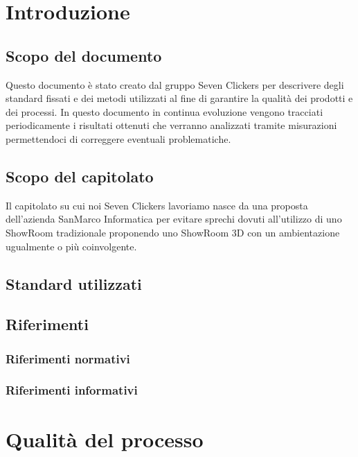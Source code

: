 \section{Introduzione}
\subsection{Scopo del documento}
Questo documento è stato creato dal gruppo Seven Clickers per descrivere degli standard fissati e dei metodi utilizzati al fine di garantire la qualità dei prodotti e dei processi.
In questo documento in continua evoluzione vengono tracciati periodicamente i risultati ottenuti che verranno analizzati tramite misurazioni permettendoci di correggere eventuali problematiche.

\subsection{Scopo del capitolato}
Il capitolato su cui noi Seven Clickers lavoriamo nasce da una proposta dell'azienda SanMarco Informatica per evitare sprechi dovuti all'utilizzo di uno ShowRoom tradizionale proponendo uno ShowRoom 3D con un ambientazione ugualmente o più coinvolgente.

\subsection{Standard utilizzati}


\subsection{Riferimenti}


\subsubsection{Riferimenti normativi}


\subsubsection{Riferimenti informativi}


\section{Qualità del processo}